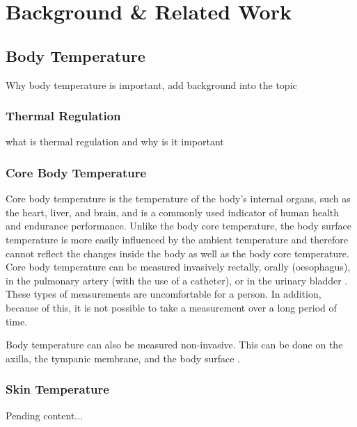 
\chapter{Background \& Related Work}
\label{ch:Background}

\section{Body Temperature}
Why body temperature is important, add background into the topic
\subsection{Thermal Regulation}
what is thermal regulation and why is it important

\subsection{Core Body Temperature}
Core body temperature is the temperature of the body's internal organs, such as the heart, liver, and brain, and is a commonly used indicator of human health and endurance performance.
Unlike the body core temperature, the body surface temperature is more easily influenced by the ambient temperature and therefore cannot reflect the changes inside the body as well as the body core temperature.
Core body temperature can be measured invasively rectally, orally (oesophagus), in the pulmonary artery (with the use of a catheter), or in the urinary bladder \cite{moranCoreTemperatureMeasurement2002a}. 
These types of measurements are uncomfortable for a person. 
In addition, because of this, it is not possible to take a measurement over a long period of time.

Body temperature can also be measured non-invasive.
This can be done on the axilla, the tympanic membrane, and the body surface \cite{moranCoreTemperatureMeasurement2002a}.

\subsection{Skin Temperature}
Pending content... 

